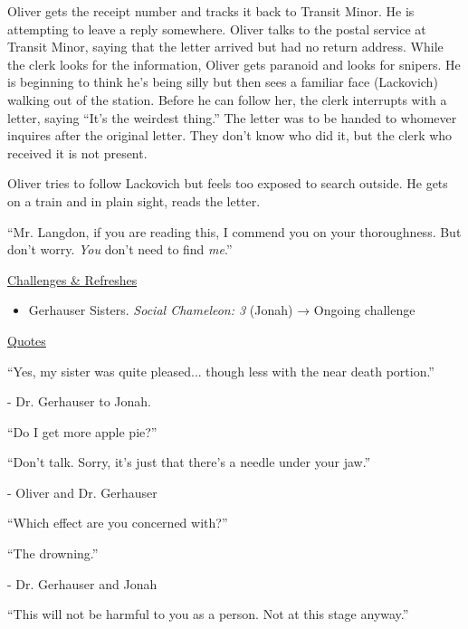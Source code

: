 Oliver gets the receipt number and tracks it back to Transit Minor.   He is attempting to leave a reply somewhere.  Oliver talks to the postal service at Transit Minor, saying that the letter arrived but had no return address.  While the clerk looks for the information, Oliver gets paranoid and looks for snipers.  He is beginning to think he's being silly but then sees a familiar face (Lackovich) walking out of the station.  Before he can follow her, the clerk interrupts with a letter, saying ``It's the weirdest thing.''  The letter was to be handed to whomever inquires after the original letter.  They don't know who did it, but the clerk who received it is not present.



Oliver tries to follow Lackovich but feels too exposed to search outside.  He gets on a train and in plain sight, reads the letter.



``Mr. Langdon, if you are reading this, I commend you on your thoroughness.  But don't worry.  \textit{You} don't need to find \textit{me}.''



\underline{  {\LARGE Challenges \& Refreshes }  }



\begin{itemize}
\item Gerhauser Sisters. \textit{Social Chameleon: 3} (Jonah) → Ongoing challenge
\end{itemize}



\underline{  {\LARGE Quotes }  }



``Yes, my sister was quite pleased... though less with the near death portion.''

- Dr. Gerhauser to Jonah.



``Do I get more apple pie?''

``Don't talk.  Sorry, it's just that there's a needle under your jaw.''

                - Oliver and Dr. Gerhauser



``Which effect are you concerned with?''

``The drowning.''

                - Dr. Gerhauser and Jonah



``This will not be harmful to you as a person.  Not at this stage anyway.''

